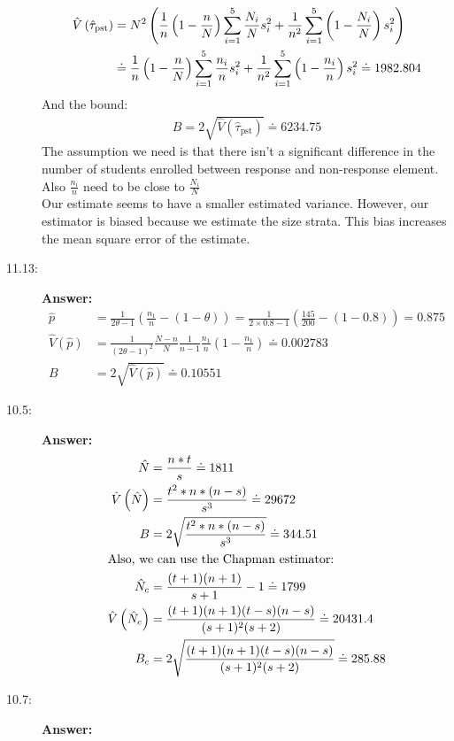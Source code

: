 \documentclass{article}
\begin{document}
\begin{description}
\begin{align}
      \hat{V}\left(\hat{\tau }_{\text{pst}}\right)&=N^2\left(\frac{1}{n}\left(1-\frac{n}{N}\right)\sum _{i=1}^5 \frac{N_i}{N}s_i^2+\frac{1}{n^2}\sum _{i=1}^5 \left(1-\frac{N_i}{N}\right)s_i^2\right)\\ \notag
      &\doteq \frac{1}{n}\left(1-\frac{n}{N}\right)\sum _{i=1}^5 \frac{n_i}{n}s_i^2+\frac{1}{n^2}\sum _{i=1}^5 \left(1-\frac{n_i}{n}\right)s_i^2\doteq 1982.804
    \end{align}
    And the bound:
    \begin{align}
      B=2\sqrt{\hat{V}\left(\hat{\tau }_{\text{pst}}\right)}\doteq 6234.75
    \end{align}
    The assumption we need is that there isn't a significant difference in the number of students enrolled between response and non-response element. Also $\frac{n_i}{n}$ need to be close to $\frac{N_i}{N}$\\
    Our estimate seems to have a smaller estimated variance. However, our estimator is biased because we estimate the size strata. This bias increases the mean square error of the estimate.
    \item[11.13:]{\bf Answer:}
    \begin{align}
      \hat{p}&=\frac{1}{2\theta -1}\left(\frac{n_1}{n}-(1-\theta )\right)=\frac{1}{2\times 0.8-1}\left(\frac{145}{200}-(1-0.8)\right)=0.875\\
      \hat{V}\left(\hat{p}\right)&=\frac{1}{(2\theta -1)^2}\frac{N-n}{N}\frac{1}{n-1}\frac{n_1}{n}\left(1-\frac{n_1}{n}\right)\doteq 0.002783\\
      B&=2\sqrt{\hat{V}\left(\hat{p}\right)}\doteq 0.10551
    \end{align}
    \item[10.5:]{\bf Answer:}
    \begin{align}
      \hat{N}&=\frac{n*t}{s}\doteq 1811\\
      \hat{V}\left(\hat{N}\right)&=\frac{t^2*n*(n-s)}{s^3}\doteq 29672\\
      B&=2\sqrt{\frac{t^2*n*(n-s)}{s^3}}\doteq 344.51\\
      \intertext{Also, we can use the Chapman estimator:}
      \hat{N}_c&=\frac{(t+1)(n+1)}{s+1}-1\doteq 1799\\
      \hat{V}\left(\hat{N}_c\right)&=\frac{(t+1)(n+1)(t-s)(n-s)}{(s+1)^2(s+2)}\doteq 20431.4\\
      B_c&=2\sqrt{\frac{(t+1)(n+1)(t-s)(n-s)}{(s+1)^2(s+2)}}\doteq 285.88
    \end{align}
    \item[10.7:]{\bf Answer:}

\end{description}
\end{document}
